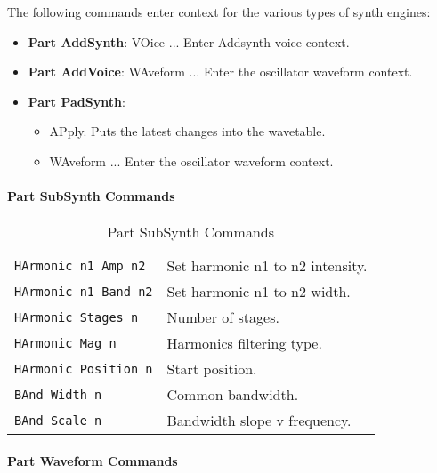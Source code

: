    The following commands enter context for the various types of
   synth engines:

   \begin{itemize}
      \item \textbf{Part AddSynth}:
        VOice ... Enter Addsynth voice context.
      \item \textbf{Part AddVoice}:
        WAveform ... Enter the oscillator waveform context.
      \item \textbf{Part PadSynth}:
      \begin{itemize}
         \item APply. Puts the latest changes into the wavetable.
         \item WAveform ... Enter the oscillator waveform context.
      \end{itemize}
   \end{itemize}

\paragraph{Part SubSynth Commands}
\label{paragraph:command_line_part_subsynth_commands}

   \begin{table}[H]
      \centering
      \caption{Part SubSynth Commands}
      \label{table:yoshimi_part_subsynth_commands}
      \begin{tabular}{l l}

\texttt{HArmonic n1 Amp n2} &
   Set harmonic n1 to n2 intensity. \\
\texttt{HArmonic n1 Band n2} &
   Set harmonic n1 to n2 width. \\
\texttt{HArmonic Stages n} &
   Number of stages. \\
\texttt{HArmonic Mag n} &
   Harmonics filtering type. \\
\texttt{HArmonic Position n} &
   Start position. \\
\texttt{BAnd Width n} &
   Common bandwidth. \\
\texttt{BAnd Scale n} &
   Bandwidth slope v frequency. \\

      \end{tabular}
   \end{table}

\paragraph{Part Waveform Commands}
\label{paragraph:command_line_part_waveform_commands}

